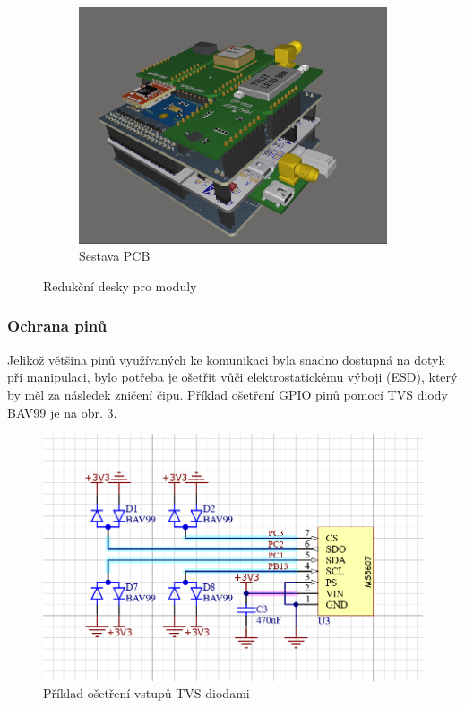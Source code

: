 \documentclass[twoside]{ctuthesis}
\theoremstyle{plain}
\theoremstyle{definition}
\theoremstyle{note}
\begin{document}
\begin{figure}[hbtp]
\begin{subfigure}{.3\textwidth}
				\includegraphics[height=0.7\linewidth]{Figures/shield_assembly.png}
				\caption{Sestava PCB}
				\label{fig:shield:assembly}
			\end{subfigure}
			\caption{Redukční desky pro moduly}
			\label{fig:shields:pcb}
		\end{figure}

		\subsubsection{Ochrana pinů}
		Jelikož většina pinů využívaných ke komunikaci byla snadno dostupná na dotyk při manipulaci, bylo potřeba je ošetřit vůči elektrostatickému výboji (ESD), který by měl za následek zničení čipu. Příklad ošetření GPIO pinů pomocí TVS diody BAV99 je na obr. \ref{fig:osetreni:vstupu}.
		
		\begin{figure}
			\centering
			\includegraphics[width = .7\textwidth]{Figures/osetreni_vstupu.png}
			\caption{Příklad ošetření vstupů TVS diodami}
			\label{fig:osetreni:vstupu}
		\end{figure}
\end{document}
